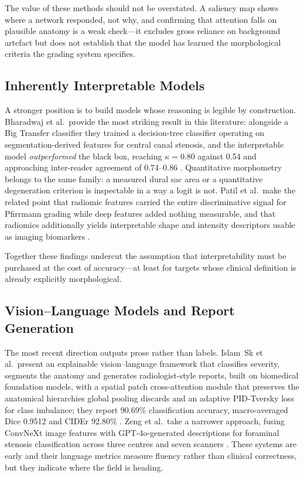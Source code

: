 The value of these methods should not be overstated. A saliency map shows where
a network responded, not why, and confirming that attention falls on plausible
anatomy is a weak check---it excludes gross reliance on background artefact but
does not establish that the model has learned the morphological criteria the
grading system specifies.

\subsection{Inherently Interpretable Models}
\label{sec:lr-interpretable}

A stronger position is to build models whose reasoning is legible by
construction. Bharadwaj et al.\ provide the most striking result in this
literature: alongside a Big Transfer classifier they trained a decision-tree
classifier operating on segmentation-derived features for central canal stenosis,
and the interpretable model \emph{outperformed} the black box, reaching
$\kappa = 0.80$ against 0.54 and approaching inter-reader agreement of 0.74--0.86
\cite{bharadwaj2023deep}. Quantitative morphometry belongs to the same family:
a measured dural sac area \cite{ghobrial2025deep} or a quantitative degeneration
criterion \cite{zheng2022deep} is inspectable in a way a logit is not. Patil et
al.\ make the related point that radiomic features carried the entire
discriminative signal for Pfirrmann grading while deep features added nothing
measurable, and that radiomics additionally yields interpretable shape and
intensity descriptors usable as imaging biomarkers \cite{patil2026mribased}.

Together these findings undercut the assumption that interpretability must be
purchased at the cost of accuracy---at least for targets whose clinical
definition is already explicitly morphological.

\subsection{Vision--Language Models and Report Generation}
\label{sec:lr-vlm}

The most recent direction outputs prose rather than labels. Islam~Sk et al.\
present an explainable vision--language framework that classifies severity,
segments the anatomy and generates radiologist-style reports, built on
biomedical foundation models, with a spatial patch cross-attention module that
preserves the anatomical hierarchies global pooling discards and an adaptive
PID-Tversky loss for class imbalance; they report 90.69\% classification
accuracy, macro-averaged Dice 0.9512 and CIDEr 92.80\%
\cite{islamsk2026an}. Zeng et al.\ take a narrower approach, fusing ConvNeXt
image features with GPT-4o-generated descriptions for foraminal stenosis
classification across three centres and seven scanners \cite{zeng2025gpt4lfs}.
These systems are early and their language metrics measure fluency rather than
clinical correctness, but they indicate where the field is heading.

